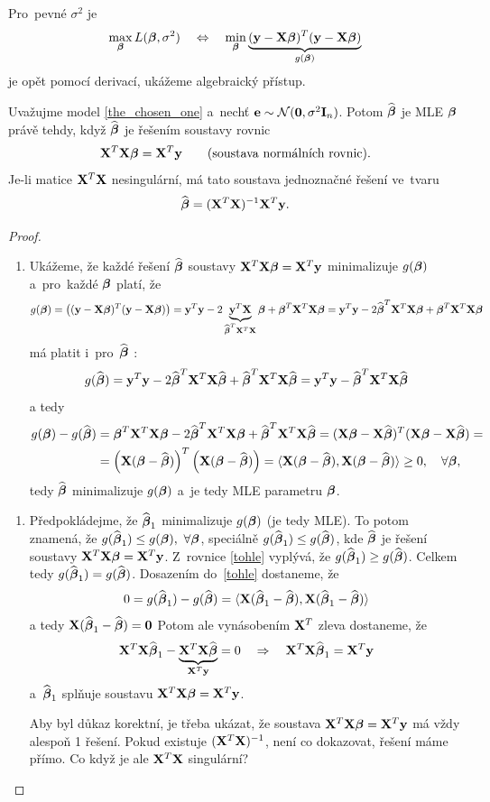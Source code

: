  Pro~pevné $\sigma^2$ je
 $$ \max_{\betab} L(\betab,\sigma^2)\quad\Leftrightarrow\quad\min_{\betab}\underbrace{(\y-\X\betab)^T(\y-\X\betab)}_{g(\betab)} $$
 je opět pomocí derivací, ukážeme algebraický přístup.

\newpage
 \begin{theorem}
 	Uvažujme model \eqref{the_chosen_one} a~nechť $\eb\sim\NN(\nula,\sigma^2 \In)$. Potom $\wbetab$ je MLE $\betab$ právě tehdy, když $\wbetab$ je řešením soustavy rovnic
 	 $$ \X^T\X\betab = \X^T\y\qquad\text{(soustava normálních rovnic)}. $$
 	Je-li matice $\X^T\X$ nesingulární, má tato soustava jednoznačné řešení ve~tvaru
 	 $$ \wbetab = (\X^T\X)^{-1}\X^T\y. $$
 	\begin{proof}
 		\begin{enumerate}[$\Leftarrow$]
 			\item Ukážeme, že každé řešení $\wbetab$ soustavy $\X^T\X\betab = \X^T\y$ minimalizuje $g(\betab)$ a~pro~každé $\betab$ platí, že
 			 $$ g(\bbeta) = \left((\y-\X\betab)^T(\y-\X\betab)\right) = \y^T\y-2\underbrace{\y^T\X}_{\wbetab^T\X^T\X}\betab+\betab^T\X^T\X\betab = \y^T\y-2\wbetab^T\X^T\X\betab+\betab^T\X^T\X\betab $$
 			má platit i~pro~$\wbetab$ :
 			 $$ g(\wbetab) = \y^T\y-2\wbetab^T\X^T\X\wbetab+\wbetab^T\X^T\X\wbetab = \y^T\y-\wbetab^T\X^T\X\wbetab $$
 			a tedy
 			\begin{align}
 			g(\bbeta)-g(\wbetab)& = \betab^T\X^T\X\betab-2\wbetab^T\X^T\X\betab+\wbetab^T\X^T\X\wbetab = (\X\betab-\X\wbetab)^T(\X\betab-\X\wbetab) = \\
 			&= \left(\X(\betab-\wbetab) \right)^T\left(\X(\betab-\wbetab) \right) = \langle \X(\betab-\wbetab),\X(\betab-\wbetab) \rangle\geq 0,\quad\forall\betab, \label{tohle}
 			\end{align}
 			 tedy $\wbetab$ minimalizuje $g(\bbeta)$ a~je tedy MLE parametru $\betab$.
 		\end{enumerate}
 	\begin{enumerate}[$\Rightarrow$]
 		\item Předpokládejme, že $\wbetab_1$ minimalizuje $g(\betab)$ (je tedy MLE). To potom znamená, že \linebreak $g(\wbetab_1)\leq g(\betab),~\forall \betab$, speciálně $g(\wbetab_1)\leq g(\wbetab)$, kde $\wbetab$ je řešení soustavy $\X^T\X\betab = \X^T\y$. Z~rovnice \eqref{tohle} vyplývá, že $g(\wbetab_1)\geq g(\wbetab)$. Celkem tedy $g(\wbetab_1) = g(\wbetab)$. Dosazením do~\eqref{tohle} dostaneme, že
 		 $$ 0 = g(\wbetab_1)-g(\wbetab) = \langle \X(\wbetab_1-\wbetab),\X(\wbetab_1-\wbetab) \rangle $$
 		a tedy $\X(\wbetab_1-\wbetab) = \nula$ Potom ale vynásobením $\X^T$ zleva dostaneme, že
 		 $$ \X^T\X\wbetab_1 - \underbrace{\X^T\X\wbetab}_{\X^T\y} = 0\quad\Rightarrow\quad \X^T\X\wbetab_1 = \X^T\y $$
 		 a~$\wbetab_1$ splňuje soustavu $\X^T\X\betab = \X^T\y$.
 		
 		Aby byl důkaz korektní, je třeba ukázat, že soustava $\X^T\X\betab = \X^T\y$ má vždy alespoň 1 řešení. Pokud existuje $(\X^T\X)^{-1}$, není co dokazovat, řešení máme přímo. Co když je ale $\X^T\X$ singulární?
 	\end{enumerate}
 	\end{proof}
 \end{theorem}
